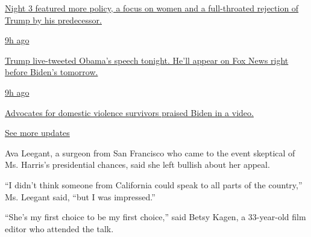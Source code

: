 \href{https://www.nytimes3xbfgragh.onion/live/2020/08/19/us/dnc-convention-election?action=click\&pgtype=Article\&state=default\&region=MAIN_CONTENT_1\&context=storylines_live_updates\#night-3-featured-more-policy-a-focus-on-women-and-a-full-throated-rejection-of-trump-by-his-predecessor}{Night
3 featured more policy, a focus on women and a full-throated rejection
of Trump by his predecessor.}

\href{https://www.nytimes3xbfgragh.onion/live/2020/08/19/us/dnc-convention-election?action=click\&pgtype=Article\&state=default\&region=MAIN_CONTENT_1\&context=storylines_live_updates\#trump-live-tweeted-obamas-speech-tonight-hell-appear-on-fox-news-right-before-bidens-tomorrow}{9h
ago}

\href{https://www.nytimes3xbfgragh.onion/live/2020/08/19/us/dnc-convention-election?action=click\&pgtype=Article\&state=default\&region=MAIN_CONTENT_1\&context=storylines_live_updates\#trump-live-tweeted-obamas-speech-tonight-hell-appear-on-fox-news-right-before-bidens-tomorrow}{Trump
live-tweeted Obama's speech tonight. He'll appear on Fox News right
before Biden's tomorrow.}

\href{https://www.nytimes3xbfgragh.onion/live/2020/08/19/us/dnc-convention-election?action=click\&pgtype=Article\&state=default\&region=MAIN_CONTENT_1\&context=storylines_live_updates\#advocates-for-domestic-violence-survivors-praised-biden-in-a-video}{9h
ago}

\href{https://www.nytimes3xbfgragh.onion/live/2020/08/19/us/dnc-convention-election?action=click\&pgtype=Article\&state=default\&region=MAIN_CONTENT_1\&context=storylines_live_updates\#advocates-for-domestic-violence-survivors-praised-biden-in-a-video}{Advocates
for domestic violence survivors praised Biden in a video.}

\href{https://www.nytimes3xbfgragh.onion/live/2020/08/19/us/dnc-convention-election?action=click\&pgtype=Article\&state=default\&region=MAIN_CONTENT_1\&context=storylines_live_updates}{See
more updates}

Ava Leegant, a surgeon from San Francisco who came to the event
skeptical of Ms. Harris's presidential chances, said she left bullish
about her appeal.

``I didn't think someone from California could speak to all parts of the
country,'' Ms. Leegant said, ``but I was impressed.''

``She's my first choice to be my first choice,'' said Betsy Kagen, a
33-year-old film editor who attended the talk.


